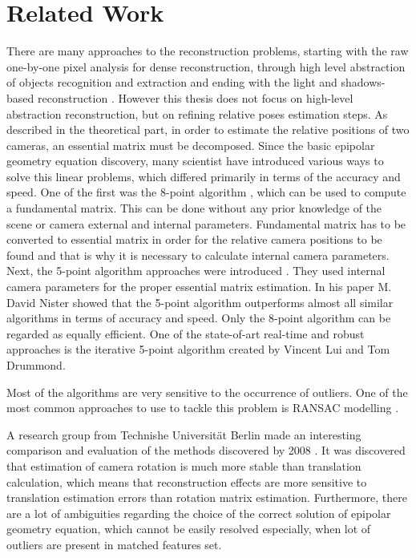 
\chapter{Related Work} %
There are many approaches to the reconstruction problems, starting with the raw one-by-one pixel analysis for dense reconstruction, through high level abstraction of objects recognition and extraction and ending with the light and shadows-based reconstruction \cite{objectRecAndLoc}\cite{combinedMonoSlam}.
However this thesis does not focus on high-level abstraction reconstruction, but on refining relative poses estimation steps. As described in the theoretical part, in order to estimate the relative positions of two cameras, an essential matrix must be decomposed. 
Since the basic epipolar geometry equation discovery, many scientist have introduced various ways to solve this linear problems, which differed primarily in terms of the accuracy and speed. One of the first was the 8-point algorithm \cite{8Point}, which can be used to compute a fundamental matrix. This can be done without any prior knowledge of the scene or camera external and internal parameters. Fundamental matrix has to be converted to essential matrix in order for the relative camera positions to be found and that is why it is necessary to calculate internal camera parameters. Next, the 5-point algorithm approaches were introduced \cite{Batra5point} \cite{Nister5point}. They used internal camera parameters for the proper essential matrix estimation. In his paper M. David Nister showed that the 5-point algorithm outperforms almost all similar algorithms in terms of accuracy and speed. Only the 8-point algorithm can be regarded as equally efficient. One of the state-of-art real-time and robust approaches is the iterative 5-point algorithm created by Vincent Lui and Tom Drummond\cite{iterative5point}.

Most of the algorithms are very sensitive to the occurrence of outliers. One of the most common approaches to use to tackle this problem is RANSAC modelling \cite{RansacRefine}.

A research group from Technishe Universität Berlin made an interesting comparison and evaluation of the methods discovered by 2008 \cite{HellwichEvaluation}. It was discovered that estimation of camera rotation is much more stable than translation calculation, which means that reconstruction effects are more sensitive to translation estimation errors than rotation matrix estimation. Furthermore, there are a lot of ambiguities regarding the choice of the correct solution of epipolar geometry equation, which cannot be easily resolved especially, when lot of outliers are present in matched features set. 


